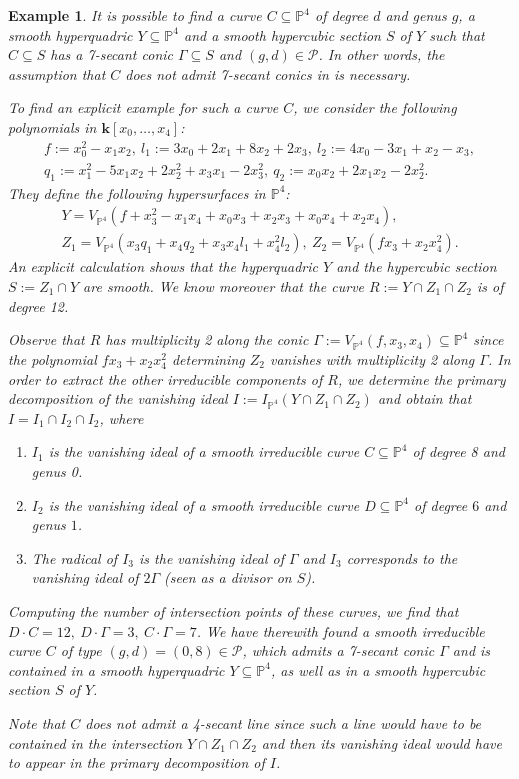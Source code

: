 \documentclass[english,11pt,reqno]{amsart}
\newcommand{\sub}{\subseteq}
\newcommand{\Pfour}{\mathbb{P}^4}
\newcommand{\VPfour}{V_{\Pfour}}
\newcommand{\kk}{\mathbf{k}}
\newcommand{\kPfour}{\kk[x_0,\dots,x_4]}
\newcommand{\Z}{\mathbb{Z}}
\newtheorem{ex}[thm]{Example}
\begin{document}
%
\begin{ex}
\label{ex:7_secant_conic_neccessary}
It is possible to find a curve $C\sub \Pfour$ of degree $d$ and genus $g$, a smooth hyperquadric $Y\sub \Pfour$ and a smooth hypercubic section $S$ of $Y$ such that $C\sub S$ has a 7-secant conic $\Gamma \sub S$ and $(g,d)\in \mathcal{P}$. In other words, the assumption that $C$ does not admit 7-secant conics in  is necessary. \par 
To find an explicit example for such a curve $C$, we consider the following polynomials in $\kPfour$:
\begin{gather*}
f:=x_0^2-x_1x_2,\: l_1:= 3x_0+2x_1+8x_2+2x_3,\: l_2:=4x_0-3x_1+x_2-x_3,\\
q_1:=x_1^2-5x_1x_2+2x_2^2+x_3x_1-2x_3^2,\: q_2:=x_0x_2+2x_1x_2-2x_2^2.
\end{gather*}
They define the following hypersurfaces in $\Pfour$:
\begin{gather*}
Y = \VPfour(f+x_3^2-x_1x_4+x_0x_3+x_2x_3+x_0x_4+x_2x_4), \\Z_1=\VPfour(x_3 q_1+x_4 q_2+x_3x_4 l_1+ x_4^2l_2),\: Z_2=\VPfour(fx_3+x_2x_4^2).
\end{gather*}
An explicit calculation shows that the hyperquadric $Y$ and the hypercubic section $S:=Z_1\cap Y$ are smooth. We know moreover that the curve $R:=Y\cap Z_1 \cap Z_2$ is of degree 12. \par 
Observe that $R$ has multiplicity 2 along the conic $\Gamma := \VPfour(f,x_3,x_4) \sub \Pfour$ since the polynomial $fx_3+x_2x_4^2$ determining $Z_2$ vanishes with multiplicity 2 along $\Gamma$. In order to extract the other irreducible components of $R$, we determine the primary decomposition of the vanishing ideal $I:=I_{\Pfour}(Y\cap Z_1\cap Z_2)$ and obtain that $I=I_1\cap I_2 \cap I_2$, where
\begin{enumerate}
\item $I_1$ is the vanishing ideal of a smooth irreducible curve $C\sub \Pfour$ of degree 8 and genus 0.
\item $I_2$ is the vanishing ideal of a smooth irreducible curve $D\sub\Pfour$ of degree $6$ and genus $1$.
\item The radical of $I_3$ is the vanishing ideal of $\Gamma$ and $I_3$ corresponds to the vanishing ideal of $2\Gamma$ (seen as a divisor on $S$).
\end{enumerate}  
Computing the number of intersection points of these curves, we find that $D\cdot C=12, \: D\cdot \Gamma=3,\:C\cdot \Gamma = 7$.
We have therewith found a smooth irreducible curve $C$ of type $(g,d)=(0,8)\in\mathcal{P}$, which admits a 7-secant conic $\Gamma$ and is contained in a smooth hyperquadric $Y\sub \Pfour$, as well as in a smooth hypercubic section $S$ of $Y$. \par 
Note that $C$ does not admit a 4-secant line since such a line would have to be contained in the intersection $Y\cap Z_1 \cap Z_2$ and then its vanishing ideal would have to appear in the primary decomposition of $I$.
\end{ex}
%
%
%
\end{document}

